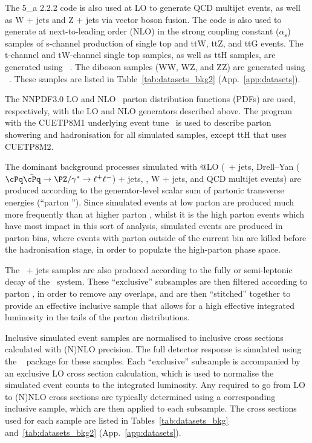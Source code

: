 The {\MADGRAPH{}5\_a\MCATNLO} 2.2.2 code is also used at LO to
generate QCD multijet events, as well as W + jets and Z + jets via
vector boson fusion. The \MADGRAPH{} code is also used to generate at
next-to-leading order (NLO) in the strong coupling constant
($\alpha_\textrm{s}$) samples of s-channel production of single top
and ttW, ttZ, and ttG events. The t-channel and tW-channel single top
samples, as well as ttH samples, are generated using
\POWHEG~\cite{nlotop}. The diboson samples (WW, WZ, and ZZ) are
generated using \PYTHIA~\cite{pythia}. These samples are listed in
Table~\ref{tab:datasets_bkg2} (App.~\ref{app:datasets}).

The {NNPDF}3.0 LO and NLO~\cite{nnpdf} parton distribution functions
(PDFs) are used, respectively, with the LO and NLO generators
described above. The \PYTHIA program with the CUETP8M1 underlying
event tune~\cite{Khachatryan:2015pea} is used to describe parton
showering and hadronisation for all simulated samples, except ttH that
uses CUETP8M2.

The dominant background processes simulated with \MADGRAPH{}@LO
(\znunu\ + jets, Drell--Yan ($\cPq\bar{\cPq} \to \PZ/\gamma^* \to
\ell^+\ell^-$) + jets, \gj, W + jets, and QCD multijet events) are
produced according to the generator-level scalar sum of partonic
transverse energies (``parton \scalht''). Since simulated events at
low parton \scalht are produced much more frequently than at higher
parton \scalht, whilst it is the high parton \scalht events which have
most impact in this sort of analysis, simulated events are produced in
parton \scalht bins, where events with parton \scalht outside of the
current bin are killed before the hadronisation stage, in order to
populate the high-parton \scalht phase space. 

The \ttbar\ + jets samples are also produced according to the fully or
semi-leptonic decay of the \ttbar\ system. These ``exclusive''
subsamples are then filtered according to parton \scalht, in order to
remove any overlaps, and are then ``stitched'' together to provide an
effective inclusive sample that allows for a high effective integrated
luminosity in the tails of the parton \scalht distributions.

Inclusive simulated event samples are normalised to inclusive cross
sections calculated with (N)NLO precision. The full detector response
is simulated using the \GEANTfour~\cite{geant} package for these
samples. Each ``exclusive'' subsample is accompanied by an exclusive
LO cross section calculation, which is used to normalise the simulated
event counts to the integrated luminosity. Any \kfactors required to
go from LO to (N)NLO cross sections are typically determined using a
corresponding inclusive sample, which are then applied to each
subsample. The cross sections used for each sample are listed in
Tables~\ref{tab:datasets_bkg} and~\ref{tab:datasets_bkg2}
(App.~\ref{app:datasets}).

